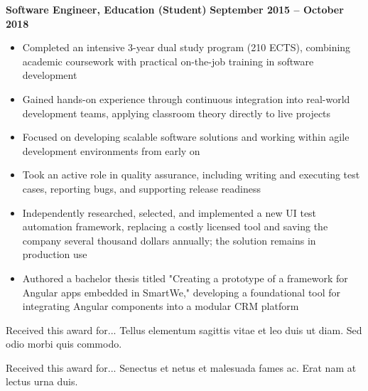 \documentclass[10pt, a4paper]{cvhari}
\begin{document}
\smallskip
\divider
\smallskip

    \textbf{Software Engineer, Education (Student)} \hfill \textbf{September 2015 -- October 2018}

    \vspace{0.2em}
    \begin{itemize}
        \item Completed an intensive 3-year dual study program (210 ECTS), combining academic coursework with practical on-the-job training in software development

        \item Gained hands-on experience through continuous integration into real-world development teams, applying classroom theory directly to live projects

        \item Focused on developing scalable software solutions and working within agile development environments from early on

        \item Took an active role in quality assurance, including writing and executing test cases, reporting bugs, and supporting release readiness

        \item Independently researched, selected, and implemented a new UI test automation framework, replacing a costly licensed tool and saving the company several thousand dollars annually; the solution remains in production use

        \item Authored a bachelor thesis titled "Creating a prototype of a framework for Angular apps embedded in SmartWe," developing a foundational tool for integrating Angular components into a modular CRM platform
    \end{itemize}



\medskip

    \bigskip
    
    {Received this award for... Tellus elementum sagittis vitae et leo duis ut diam. Sed odio morbi quis commodo.}\par
    
    \smallskip 
    \dividergray
    \smallskip
    
    {Received this award for... Senectus et netus et malesuada fames ac. Erat nam at lectus urna duis.}\par
    \medskip
\end{document}
